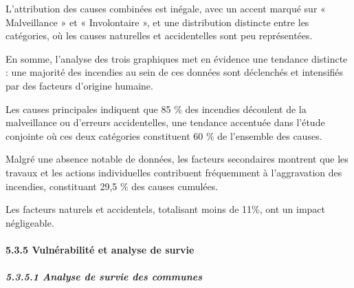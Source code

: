 \documentclass[
]{article}
\begin{document}
L'attribution des causes combinées est inégale, avec un accent marqué
sur « Malveillance » et « Involontaire », et une distribution distincte
entre les catégories, où les causes naturelles et accidentelles sont peu
représentées.

En somme, l'analyse des trois graphiques met en évidence une tendance
distincte : une majorité des incendies au sein de ces données sont
déclenchés et intensifiés par des facteurs d'origine humaine.

Les causes principales indiquent que 85 \% des incendies découlent de la
malveillance ou d'erreurs accidentelles, une tendance accentuée dans
l'étude conjointe où ces deux catégories constituent 60 \% de l'ensemble
des causes.

Malgré une absence notable de données, les facteurs secondaires montrent
que les travaux et les actions individuelles contribuent fréquemment à
l'aggravation des incendies, constituant 29,5 \% des causes cumulées.

Les facteurs naturels et accidentels, totalisant moins de 11\%, ont un
impact négligeable.

\paragraph{5.3.5 Vulnérabilité et analyse de
survie}\label{vulnuxe9rabilituxe9-et-analyse-de-survie}

\subparagraph{5.3.5.1 Analyse de survie des
communes}\label{analyse-de-survie-des-communes}
\end{document}
